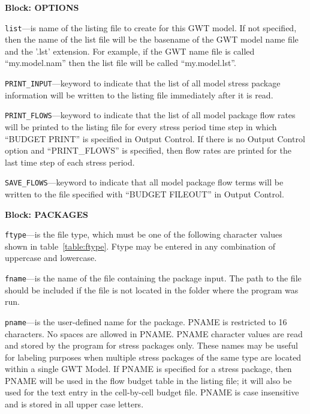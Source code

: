 
\item \textbf{Block: OPTIONS}

\begin{description}
\item \texttt{list}---is name of the listing file to create for this GWT model.  If not specified, then the name of the list file will be the basename of the GWT model name file and the '.lst' extension.  For example, if the GWT name file is called ``my.model.nam'' then the list file will be called ``my.model.lst''.

\item \texttt{PRINT\_INPUT}---keyword to indicate that the list of all model stress package information will be written to the listing file immediately after it is read.

\item \texttt{PRINT\_FLOWS}---keyword to indicate that the list of all model package flow rates will be printed to the listing file for every stress period time step in which ``BUDGET PRINT'' is specified in Output Control.  If there is no Output Control option and ``PRINT\_FLOWS'' is specified, then flow rates are printed for the last time step of each stress period.

\item \texttt{SAVE\_FLOWS}---keyword to indicate that all model package flow terms will be written to the file specified with ``BUDGET FILEOUT'' in Output Control.

\end{description}
\item \textbf{Block: PACKAGES}

\begin{description}
\item \texttt{ftype}---is the file type, which must be one of the following character values shown in table~\ref{table:ftype}. Ftype may be entered in any combination of uppercase and lowercase.

\item \texttt{fname}---is the name of the file containing the package input.  The path to the file should be included if the file is not located in the folder where the program was run.

\item \texttt{pname}---is the user-defined name for the package. PNAME is restricted to 16 characters.  No spaces are allowed in PNAME.  PNAME character values are read and stored by the program for stress packages only.  These names may be useful for labeling purposes when multiple stress packages of the same type are located within a single GWT Model.  If PNAME is specified for a stress package, then PNAME will be used in the flow budget table in the listing file; it will also be used for the text entry in the cell-by-cell budget file.  PNAME is case insensitive and is stored in all upper case letters.

\end{description}

